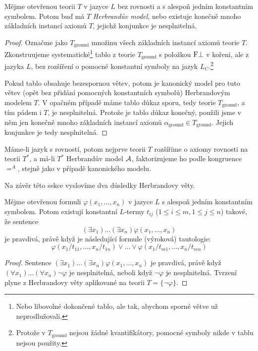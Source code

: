 \begin{theorem}
Mějme otevřenou teorii $T$ v jazyce $L$ bez rovnosti a s alespoň jedním konstantním symbolem. Potom buď má $T$ \emph{Herbrandův model}, nebo existuje konečně mnoho základních instancí axiomů $T$, jejichž konjunkce je nesplnitelná.
\end{theorem}
\begin{proof}
Označme jako $T_\text{ground}$ množinu všech základních instancí axiomů teorie $T$. Zkonstruujeme systematické\footnote{Nebo libovolné dokončené tablo, ale tak, abychom sporné větve už neprodlužovali.} tablo z teorie $T_\text{ground}$ s položkou $\mathrm{F}\bot$ v kořeni, ale z jazyka $L$, bez rozšíření o pomocné konstantní symboly na jazyk $L_C$.\footnote{Protože v $T_\text{ground}$ nejsou žádné kvantifikátory, pomocné symboly nikde v tablu nejsou použity.}

Pokud tablo obsahuje bezespornou větev, potom je kanonický model pro tuto větev (opět bez přidání pomocných konstantních symbolů) Herbrandovým modelem $T$. V opačném případě máme tablo důkaz sporu, tedy teorie $T_\text{ground}$, a tím pádem i $T$, je nesplnitelná. Protože je tablo důkaz konečný, použili jsme v něm jen konečně mnoho základních instancí axiomů $\alpha_\text{ground}\in T_\text{ground}$. Jejich konjunkce je tedy nesplnitelná.
\end{proof}

\begin{remark}
Máme-li jazyk s rovností, potom nejprve teorii $T$ rozšíříme o axiomy rovnosti na teorii $T^*$, a má-li $T^*$ Herbrandův model $\mathcal{A}$, faktorizujeme ho podle kongruence $=^A$, stejně jako v případě kanonického modelu.
\end{remark}

Na závěr této sekce vyslovíme dva důsledky Herbrandovy věty.

\begin{corollary}
    Mějme otevřenou formuli $\varphi(x_1,\dots,x_n)$ v jazyce $L$ s alespoň jedním konstantním symbolem. Potom existují konstantní $L$-termy $t_{ij}$ ($1\leq i\leq m,1\leq j\leq n$) takové, že sentence
    $$
    (\exists x_1)\dots(\exists x_n)\varphi(x_1,\dots,x_n)$$
    je pravdivá, právě když je následující formule (výroková) tautologie:
    $$
    \varphi(x_1/t_{11},\dots,x_n/t_{1n})\lor \dots \lor \varphi(x_1/t_{m1},\dots,x_n/t_{mn})
    $$
\end{corollary}
\begin{proof}
Sentence $(\exists x_1)\dots(\exists x_n)\varphi(x_1,\dots,x_n)$ je pravdivá, právě když $(\forall x_1)\dots(\forall x_n)\neg\varphi$ je nesplnitelná, neboli když $\neg\varphi$ je nesplnitelná. Tvrzení plyne z Herbrandovy věty aplikované na teorii $T=\{\neg\varphi\}$.
\end{proof}

